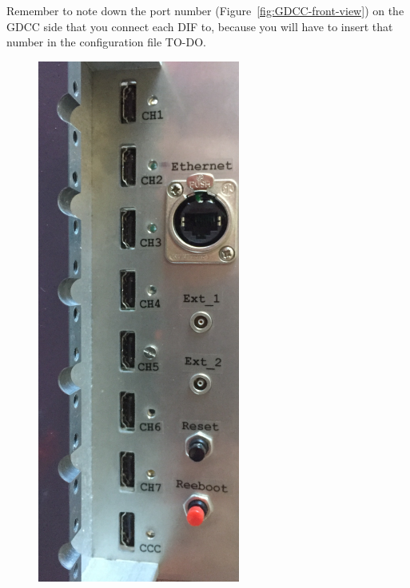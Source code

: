 Remember to note down the port number (Figure~\ref{fig:GDCC-front-view}) on the
GDCC side that you connect each DIF to, because you will have to insert that
number in the configuration file TO-DO.
\begin{figure}[H]
  \centering
  \begin{minipage}{0.2\linewidth}
    \centering \includegraphics[width=0.9\linewidth, frame]{GDCC-front-view}

\end{minipage}
\end{figure}
